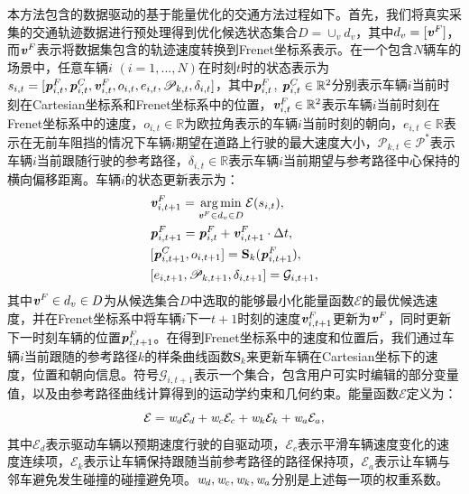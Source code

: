 本方法包含的数据驱动的基于能量优化的交通方法过程如下。首先，我们将真实采集的交通轨迹数据进行预处理得到优化候选状态集合$D=\cup_{v}d_{v}$，其中$d_v=[\textbf{\emph{v}}^{F}]$，而$\textbf{\emph{v}}^{F}$表示将数据集包含的轨迹速度转换到Frenet坐标系表示。在一个包含$N$辆车的场景中，任意车辆$i$ $(i=1,...,N)$在时刻$t$时的状态表示为$s_{i,t}=[\textbf{\emph{p}}^{F}_{i,t}, \textbf{\emph{p}}^{C}_{i,t}, \textbf{\emph{v}}^{F}_{i,t}, o_{i,t}, e_{i,t}, \mathscr{P}_{k,t}, \delta_{i,t}]$，其中$\textbf{\emph{p}}^{F}_{i,t}$,  $\textbf{\emph{p}}^{C}_{i,t}\in\mathbb{R}^2$分别表示车辆$i$当前时刻在Cartesian坐标系和Frenet坐标系中的位置，$\textbf{\emph{v}}^{F}_{i,t}\in\mathbb{R}^2$表示车辆$i$当前时刻在Frenet坐标系中的速度，$o_{i,t}\in\mathbb{R}$为欧拉角表示的车辆$i$当前时刻的朝向，$e_{i,t}\in\mathbb{R}$表示在无前车阻挡的情况下车辆$i$期望在道路上行驶的最大速度大小，$\mathscr{P}_{k,t}\in\mathscr{P}^*$表示车辆$i$当前跟随行驶的参考路径，$\delta_{i,t}\in\mathbb{R}$表示车辆$i$当前期望与参考路径中心保持的横向偏移距离。车辆$i$的状态更新表示为：
\begin{equation}
\setlength\abovedisplayskip{6pt}
\setlength\belowdisplayskip{6pt}
\begin{aligned}
    &\textbf{\emph{v}}^{F}_{i,t+1} = \mathop{\arg\min}\limits_{\textbf{\emph{v}}^{F}\in{d}_{v}\in{D}} \mathcal{E}(s_{i,t}), \\
    &\textbf{\emph{p}}^{F}_{i,t+1} = \textbf{\emph{p}}^{F}_{i,t} + \textbf{\emph{v}}^{F}_{i,t+1} \cdot \Delta{t}, \\
    &[\textbf{\emph{p}}^{C}_{i,t+1}, o_{i,t+1}] = \textbf{S}_{k}(\textbf{\emph{p}}^{F}_{i,t+1}), \\ %
    &[e_{i,t+1}, \mathscr{P}_{k,t+1}, \delta_{i,t+1}] = \mathcal{G}_{i,t+1},
\end{aligned}
\label{eq:traedits_dynamics}
\end{equation}
其中$\textbf{\emph{v}}^{F}\in{d}_{v}\in{D}$为从候选集合$D$中选取的能够最小化能量函数$\mathcal{E}$的最优候选速度，并在Frenet坐标系中将车辆$i$下一$t+1$时刻的速度$\textbf{\emph{v}}^{F}_{i,t+1}$更新为$\textbf{\emph{v}}^{F}$，同时更新下一时刻车辆的位置$\textbf{\emph{p}}^{F}_{i,t+1}$。在得到Frenet坐标系中的速度和位置后，我们通过车辆$i$当前跟随的参考路径$k$的样条曲线函数$\textbf{S}_{k}$来更新车辆在Cartesian坐标下的速度，位置和朝向信息。符号$\mathcal{G}_{i,t+1}$表示一个集合，包含用户可实时编辑的部分变量值，以及由参考路径曲线计算得到的运动学约束和几何约束。能量函数$\mathcal{E}$定义为：
\begin{equation}
\setlength\abovedisplayskip{6pt}
\setlength\belowdisplayskip{6pt}
    \mathcal{E} = \emph{w}_{d} \mathcal{E}_{d} + \emph{w}_{c} \mathcal{E}_{c} + \emph{w}_{k} \mathcal{E}_{k} + \emph{w}_{a} \mathcal{E}_{a},
\label{eq:traedits_energyfunc}
\end{equation}
其中$\mathcal{E}_{d}$表示驱动车辆以预期速度行驶的自驱动项，$\mathcal{E}_{c}$表示平滑车辆速度变化的速度连续项，$\mathcal{E}_{k}$表示让车辆保持跟随当前参考路径的路径保持项，$\mathcal{E}_{a}$表示让车辆与邻车避免发生碰撞的碰撞避免项。$\emph{w}_{d}, \emph{w}_{c}, \emph{w}_{k}, \emph{w}_{a}$分别是上述每一项的权重系数。

